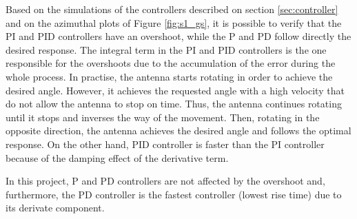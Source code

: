 Based on the simulations of the controllers described on section \ref{sec:controller} and on the azimuthal plots of Figure \ref{fig:s1_gs}, it is possible to verify that the PI and PID controllers have an overshoot, while the P and PD follow directly the desired response. The integral term in the PI and PID controllers is the one responsible for the overshoots due to the accumulation of the error during the whole process. In practise, the antenna starts rotating in order to achieve the desired angle. However, it achieves the requested angle with a high velocity that do not allow the antenna to stop on time. Thus, the antenna continues rotating until it stops and inverses the way of the movement. Then, rotating in the opposite direction, the antenna achieves the desired angle and follows the optimal response. On the other hand, PID controller is faster than the PI controller because of the damping effect of the derivative term.

In this project, P and PD controllers are not affected by the overshoot and, furthermore, the PD controller is the fastest controller (lowest rise time) due to its derivate component.

